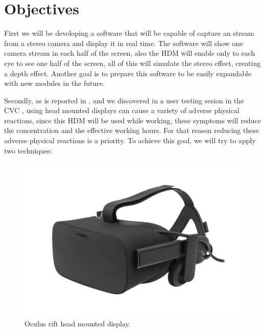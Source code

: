 \documentclass[10pt,a4paper,twocolumn,twoside]{article}
\begin{document}
\section{Objectives}

First we will be developing a software that will be capable of capture an stream from a stereo camera and display it in real time. The software will show one camera stream in each half of the screen, also the HDM will enable only to each eye to see one half of the screen, all of this will simulate the stereo effect, creating a depth effect. Another goal is to prepare this software to be easily expandable with new modules in the future.

Secondly, as is reported in \cite{disconfortReview}, and we discovered in a user testing sesion in the CVC \cite{unpublishCVC}, using head mounted displays can cause a variety of adverse physical reactions, since this HDM will be used while working, these symptoms will reduce the concentration and the effective working hours. For that reason reducing these adverse physical reactions is a priority. To achieve this goal, we will try to apply two techniques: 

\begin{figure}
	\centering
	\includegraphics[width=0.7\linewidth]{img/1200px-Oculus-Rift-CV1-Headset-Front}
	\caption{Oculus rift head mounted display.}
	\label{fig:oculus}
\end{figure}
\end{document}
